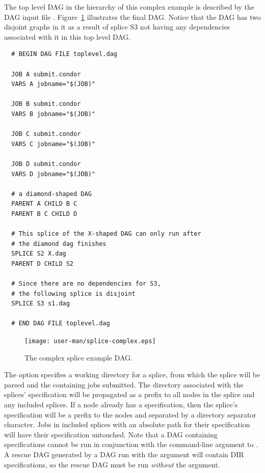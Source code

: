 The top level DAG in the hierarchy of this complex example
is described by the DAG input file .
Figure~\ref{fig:dagman-splice-complex} illustrates the final DAG.
Notice that the DAG has two disjoint graphs in it as a result of splice
S3 not having any dependencies associated with it in this top level DAG.

\begin{verbatim}
  # BEGIN DAG FILE toplevel.dag

  JOB A submit.condor
  VARS A jobname="$(JOB)"

  JOB B submit.condor
  VARS B jobname="$(JOB)"

  JOB C submit.condor
  VARS C jobname="$(JOB)"

  JOB D submit.condor
  VARS D jobname="$(JOB)"

  # a diamond-shaped DAG
  PARENT A CHILD B C
  PARENT B C CHILD D

  # This splice of the X-shaped DAG can only run after
  # the diamond dag finishes
  SPLICE S2 X.dag
  PARENT D CHILD S2

  # Since there are no dependencies for S3,
  # the following splice is disjoint 
  SPLICE S3 s1.dag

  # END DAG FILE toplevel.dag
\end{verbatim}


\begin{figure}
\centering
\texttt{[image: user-man/splice-complex.eps]}
\caption{\label{fig:dagman-splice-complex} The complex splice example DAG.}
\end{figure}

The  option specifies a working directory for a splice,
from which the splice will be parsed and the containing jobs submitted.
The directory associated with the splices'  specification
will be propagated as a prefix to all nodes in the splice and any 
included splices.
If a node already has a  specification, then the splice's
 specification will be a prefix to the nodes and separated by
a directory separator character.
Jobs in included splices with an absolute path for their 
specification will have their  specification untouched.
Note that a DAG containing  specifications cannot be run
in conjunction with the  command-line argument to
.
A rescue DAG generated by a DAG run with the  argument
will contain DIR specifications, so the rescue DAG must be run
\emph{without} the  argument.



